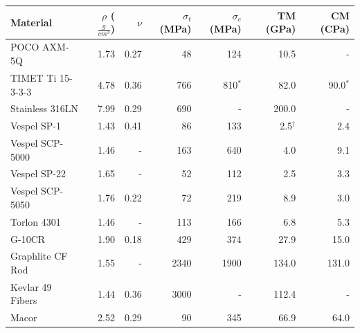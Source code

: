 \documentclass[final]{svjour2}
\begin{document}
\begin{table}[h]%
\begin{tabular}{lrrrrrr}
\toprule
\textbf{Material} & $\rho$ ($\frac{g}{cm^3}$) & $\nu$ & $\sigma_{t}$ (MPa) & $\sigma_{c}$ (MPa) & TM (GPa) & CM (CPa) \\
\midrule
 POCO AXM-5Q & 1.73 & 0.27 & 48 & 124\phantom{$^*$} & 10.5\phantom{$^{\dag}$} & -\phantom{$^*$} \\
 TIMET Ti 15-3-3-3 & 4.78 & 0.36 & 766 & 810$^*$ & 82.0\phantom{$^{\dag}$} & 90.0$^*$ \\
 Stainless 316LN & 7.99 & 0.29 & 690 & -\phantom{$^*$} & 200.0\phantom{$^{\dag}$} & -\phantom{$^*$} \\
 Vespel SP-1 & 1.43 & 0.41 & 86 & 133\phantom{$^*$} & 2.5$^{\dag}$ & 2.4\phantom{$^*$} \\
 Vespel SCP-5000 & 1.46 & - & 163 & 640\phantom{$^*$} & 4.0\phantom{$^{\dag}$} & 9.1\phantom{$^*$} \\
 Vespel SP-22 & 1.65 & - & 52 & 112\phantom{$^*$} & 2.5\phantom{$^{\dag}$} & 3.3\phantom{$^*$} \\
 Vespel SCP-5050 & 1.76 & 0.22 & 72 & 219\phantom{$^*$} & 8.9\phantom{$^{\dag}$} & 3.0\phantom{$^*$} \\
 Torlon 4301 & 1.46 & - & 113 & 166\phantom{$^*$} & 6.8\phantom{$^{\dag}$} & 5.3\phantom{$^*$} \\
 G-10CR & 1.90 & 0.18 & 429 & 374\phantom{$^*$} & 27.9\phantom{$^{\dag}$} & 15.0\phantom{$^*$} \\
 Graphlite CF Rod & 1.55 & -  & 2340 & 1900\phantom{$^*$} & 134.0\phantom{$^{\dag}$} & 131.0\phantom{$^*$} \\
 Kevlar 49 Fibers & 1.44 & 0.36 & 3000 & -\phantom{$^*$} & 112.4\phantom{$^{\dag}$} & -\phantom{$^*$} \\
 Macor & 2.52 & 0.29 & 90 & 345\phantom{$^*$} & 66.9\phantom{$^{\dag}$} & 64.0\phantom{$^*$} \\


\end{tabular}
\end{table}
\end{document}
